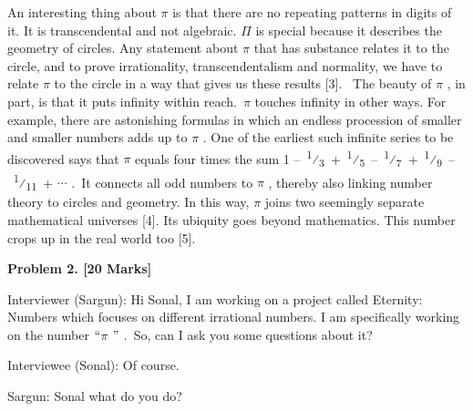 \documentclass[12pt]{article}
\begin{document}
\begin{justify}
An interesting thing about $ \pi $  is that there are no repeating patterns in digits of it. It is transcendental and not algebraic. $ \Pi $  is special because it describes the geometry of circles. Any statement about $ \pi $  that has substance relates it to the circle, and to prove irrationality, transcendentalism and normality, we have to relate $ \pi $  to the circle in a way that gives us these results [3].  The beauty of $ \pi $ , in part, is that it puts infinity within reach. $ \pi $  touches infinity in other ways. For example, there are astonishing formulas in which an endless procession of smaller and smaller numbers adds up to $ \pi $ . One of the earliest such infinite series to be discovered says that $ \pi $  equals four times the sum 1 – \textsuperscript{1}⁄\textsubscript{3} + \textsuperscript{1}⁄\textsubscript{5} – \textsuperscript{1}⁄\textsubscript{7} + \textsuperscript{1}⁄\textsubscript{9} – \textsuperscript{1}⁄\textsubscript{11} + $ \cdots $ . It connects all odd numbers to $ \pi $ , thereby also linking number theory to circles and geometry. In this way, $ \pi $  joins two seemingly separate mathematical universes [4]. Its ubiquity goes beyond mathematics. This number crops up in the real world too [5].
\end{justify}\par


\vspace{\baselineskip}

\vspace{\baselineskip}
\begin{justify}
{\fontsize{14pt}{16.8pt}\selectfont \textbf{Problem 2. [20 Marks]}\par}
\end{justify}\par

\begin{justify}
Interviewer (Sargun): Hi Sonal, I am working on a project called Eternity: Numbers which focuses on different irrational numbers. I am specifically working on the number $``$$ \pi $ $"$ .\  So, can I ask you some questions about it?
\end{justify}\par

\begin{justify}
Interviewee (Sonal): Of course.
\end{justify}\par

\begin{justify}
Sargun: Sonal what do you do?
\end{justify}\par
\end{document}
